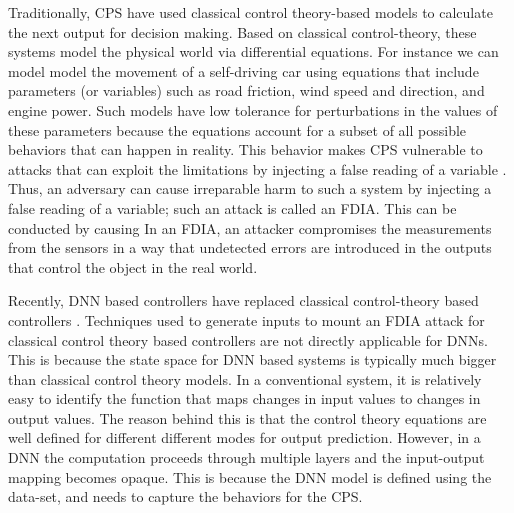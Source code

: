Traditionally, \ac{CPS} have used classical control theory-based models  \cite{1337806} \cite{10.1145/2038642.2038667} \cite{6051465} to calculate the next output for decision making. 
Based on classical control-theory, these systems model the physical world via differential equations. 
For instance we can model model the movement of a self-driving car using equations that include parameters (or variables) such as road friction, wind speed and direction, and engine power. 
Such models have low tolerance for perturbations in the values of these parameters because the equations account for a subset of all possible behaviors that can happen in reality. 
This behavior makes \ac{CPS} vulnerable to attacks that can exploit the limitations by injecting a false reading of a variable \cite{10.1145/1952982.1952995}. 
Thus, an adversary can cause irreparable harm to such a system by injecting a false reading of a variable; such an attack is called an \ac{FDIA}.
This can be conducted by causing 
 In an \ac{FDIA}, an attacker compromises the measurements from the sensors in a way that undetected errors are introduced in the outputs \cite{7438916} that control the object in the real world. 
 


Recently,  \ac{DNN} based controllers have replaced classical control-theory based controllers \cite{xiang18} \cite{Kocic2019} \cite{bechtel2017deeppicar}.  
Techniques used to generate inputs to mount an FDIA attack for classical control theory based controllers are not directly applicable for DNNs.
This is because the state space for DNN based systems is typically much bigger than classical control theory models. 
In a conventional system, it is relatively easy to identify the function that maps changes in input values to changes in output values. 
The reason behind this is that the control theory equations are well defined for different different modes for output prediction.
However, in a \ac{DNN} the computation proceeds through multiple layers and the input-output mapping becomes opaque. 
This is because the \ac{DNN} model is defined using the data-set, and needs to capture the behaviors for the \ac{CPS}.


